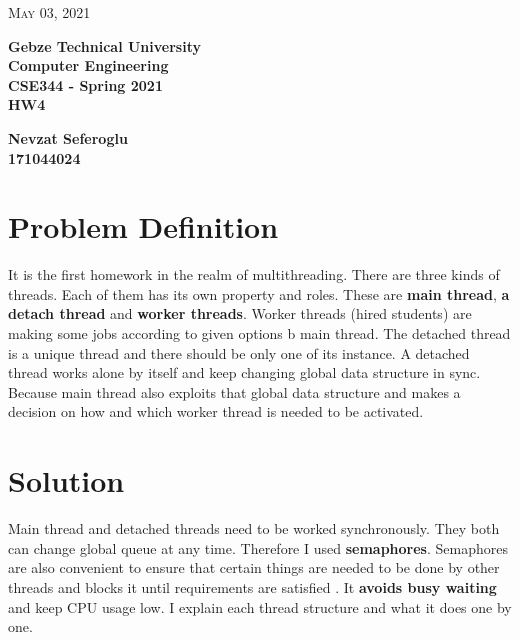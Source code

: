 \documentclass{article}
\begin{document}
\begin{titlepage}

	\begin{flushright}
	\textsc{\large May 03, 2021} \\
	\end{flushright}
	\begin{center}
	\Large{\bfseries Gebze Technical University \\ Computer Engineering \\ CSE344 - Spring 2021 \\ HW4} \\
	\end{center}
	\vspace*{\fill}
	\begin{center}
	\Large{\bfseries Nevzat Seferoglu \\ 171044024 }
	\end{center}
	\vspace*{\fill}
\end{titlepage}

\cleardoublepage
\section{Problem Definition}
It is the first homework in the realm of multithreading. There are three kinds of threads. Each of them has its own property and roles. These are \textbf{main thread}, \textbf{a detach thread} and \textbf{worker threads}. Worker threads (hired students) are making some jobs according to given options b main thread. The detached thread is a unique thread and there should be only one of its instance. A detached thread works alone by itself and keep changing global data structure in sync. Because main thread also exploits that global data structure and makes a decision on how and which worker thread is needed to be activated.

\section{Solution}
Main thread and detached threads need to be worked synchronously. They both can change global queue at any time. Therefore I used \textbf{semaphores}. Semaphores are also convenient to ensure that certain things are needed to be done by other threads and blocks it until requirements are satisfied . It \textbf{avoids busy waiting} and keep CPU usage low. I explain each thread structure and what it does one by one.
\end{document}
